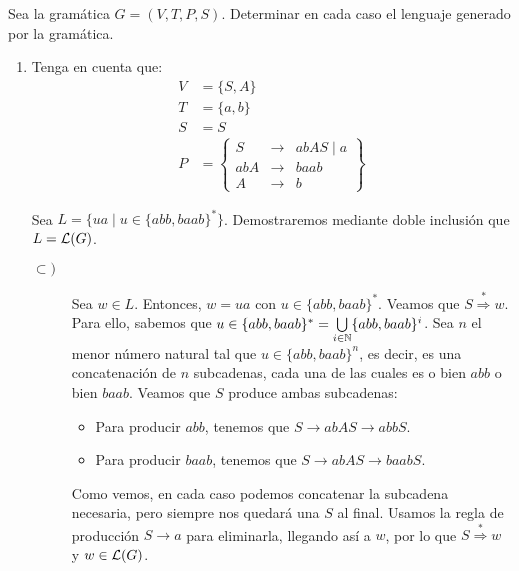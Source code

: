 \begin{ejercicio} \label{ej:1.2}
    Sea la gramática $G=\left(V,T,P,S\right)$. Determinar en cada caso el lenguaje generado por la gramática.
    \begin{enumerate}
        \item Tenga en cuenta que:
        \begin{align*}
            V &= \{S,A\}\\
            T &= \{a,b\}\\
            S &= S \\
            P &= \left\{
                \begin{array}{rcl}
                    S &\rightarrow & abAS \mid a \\
                    abA &\rightarrow & baab \\
                    A &\rightarrow & b
                \end{array}
            \right\}
        \end{align*}

        Sea $L=\{ua \mid u\in \{abb, baab\}^\ast\}$. Demostraremos mediante doble inclusión que $L=\mathcal{L}(G)$.
        \begin{description}
            \item[$\subset)$] Sea $w\in L$. Entonces, $w=ua$ con $u\in \{abb, baab\}^\ast$. Veamos que
            $S \stackrel{\ast}{\Longrightarrow} w$. Para ello, sabemos que $u\in \{abb, baab\}^\ast=\bigcup\limits_{i\in \mathbb{N}} \{abb, baab\}^i$.
            Sea $n$ el menor número natural tal que $u\in \{abb, baab\}^n$, es decir, es una concatenación de $n$ subcadenas, cada una de las cuales es o bien $abb$ o bien $baab$. Veamos que $S$ produce ambas subcadenas:
            \begin{itemize}
                \item Para producir $abb$, tenemos que $S\rightarrow abAS \rightarrow abbS$.
                \item Para producir $baab$, tenemos que $S\rightarrow abAS \rightarrow baabS$.
            \end{itemize}
            Como vemos, en cada caso podemos concatenar la subcadena necesaria, pero siempre nos quedará una $S$ al final. Usamos la regla de producción $S\rightarrow a$ para eliminarla, llegando así a $w$, por lo que $S \stackrel{\ast}{\Longrightarrow} w$ y $w\in \mathcal{L}(G)$.


\end{description}
\end{enumerate}
\end{ejercicio}
